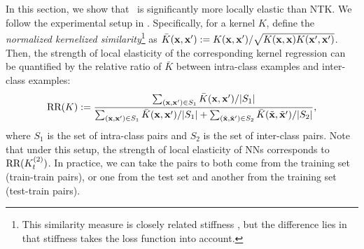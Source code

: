 In this section, we show that \lantk~is significantly more locally elastic than NTK. We follow the experimental setup in \citet{he2019local}.
Specifically, for a kernel $K$, define the \emph{normalized kernelized similarity}\footnote{This similarity measure is closely related stiffness \citep{fort2019stiffness}, but the difference lies in that stiffness takes the loss function into account.} as $\bar{K}({\mathbf{x}}, {\mathbf{x}}'):= K({\mathbf{x}}, {\mathbf{x}}')/\sqrt{K({\mathbf{x}}, {\mathbf{x}}) K({\mathbf{x}}', {\mathbf{x}}')}$. Then, the strength of local elasticity of the corresponding kernel regression can be quantified by the relative ratio of $\bar K$ between intra-class examples and inter-class examples:
\begin{equation}
    \label{eq: relative_ratio}
    \textnormal{RR}(K):= \frac{\sum_{({\mathbf{x}}, {\mathbf{x}}')\in S_1} \bar K({\mathbf{x}}, {\mathbf{x}}') / |S_1|}{\sum_{({\mathbf{x}}, {\mathbf{x}}')\in S_1} \bar K({\mathbf{x}}, {\mathbf{x}}') / |S_1| + \sum_{(\tilde{{\mathbf{x}}}, \tilde{{\mathbf{x}}}')\in S_2} \bar K(\tilde{{\mathbf{x}}}, \tilde{{\mathbf{x}}}') / |S_2|},
\end{equation}
where $S_1$ is the set of intra-class pairs and $S_2$ is the set of inter-class pairs. Note that under this setup, the strength of local elasticity of NNs corresponds to $\textnormal{RR}({K}^{(2)}_t)$. In practice, we can take the pairs to both come from the training set (train-train pairs), or one from the test set and another from the training set (test-train pairs). 



